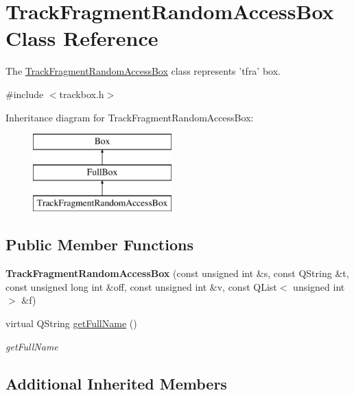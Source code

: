 \hypertarget{class_track_fragment_random_access_box}{\section{Track\-Fragment\-Random\-Access\-Box Class Reference}
\label{class_track_fragment_random_access_box}
}


The \hyperlink{class_track_fragment_random_access_box}{Track\-Fragment\-Random\-Access\-Box} class represents 'tfra' box.  




{\ttfamily \#include $<$trackbox.\-h$>$}

Inheritance diagram for Track\-Fragment\-Random\-Access\-Box\-:\begin{figure}[H]
\begin{center}
\leavevmode
\includegraphics[height=3.000000cm]{class_track_fragment_random_access_box}
\end{center}
\end{figure}
\subsection*{Public Member Functions}
\begin{DoxyCompactItemize}
\item 
\hypertarget{class_track_fragment_random_access_box_a7c89001ebec3ad38559d5c6aaf3c10d1}{{\bfseries Track\-Fragment\-Random\-Access\-Box} (const unsigned int \&s, const Q\-String \&t, const unsigned long int \&off, const unsigned int \&v, const Q\-List$<$ unsigned int $>$ \&f)}\label{class_track_fragment_random_access_box_a7c89001ebec3ad38559d5c6aaf3c10d1}

\item 
virtual Q\-String \hyperlink{class_track_fragment_random_access_box_afeb1c2b67373428008a209cf01f6df10}{get\-Full\-Name} ()
\begin{DoxyCompactList}\small\item\em get\-Full\-Name \end{DoxyCompactList}\end{DoxyCompactItemize}
\subsection*{Additional Inherited Members}


